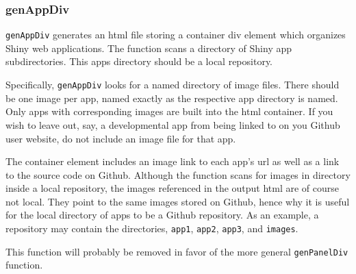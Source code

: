 \documentclass{article}\usepackage[]{graphicx}\usepackage[]{color}
\begin{document}
\title{}
\author{}
\maketitle





\subsubsection{genAppDiv}

\texttt{genAppDiv} generates an html file storing a container div element which organizes Shiny web applications.
The function scans a directory of Shiny app subdirectories.
This apps directory should be a local repository.

Specifically, \texttt{genAppDiv} looks for a named directory of image files.
There should be one image per app, named exactly as the respective app directory is named.
Only apps with corresponding images are built into the html container.
If you wish to leave out, say, a developmental app from being linked to on you Github user website, do not include an image file for that app.

The container element includes an image link to each app's url as well as a link to the source code on Github.
Although the function scans for images in directory inside a local repository, the images referenced in the output html are of course not local.
They point to the same images stored on Github, hence why it is useful for the local directory of apps to be a Github repository.
As an example, a repository may contain the directories, \texttt{app1}, \texttt{app2}, \texttt{app3}, and \texttt{images}.

This function will probably be removed in favor of the more general \texttt{genPanelDiv} function.
\end{document}
